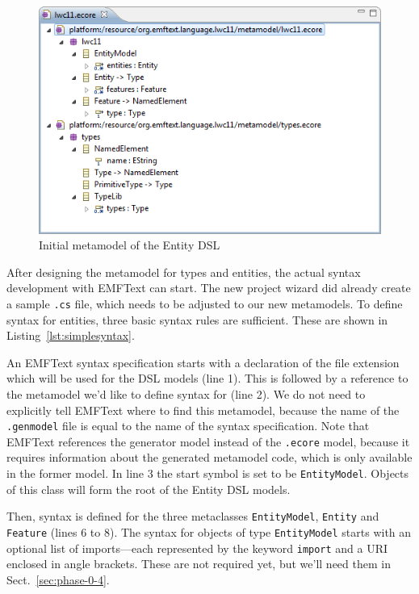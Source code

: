 \documentclass[10pt, pdftex]{llncs}
\begin{document}
\begin{figure}
	\centering
	\includegraphics[width=1.00\textwidth]{figures/metamodel1.png}
	\caption{Initial metamodel of the Entity DSL}
	\label{fig:metamodel1}
\end{figure}

After designing the metamodel for types and entities, the actual syntax
development with EMFText can start. The new project wizard did already create a
sample \texttt{.cs} file, which needs to be adjusted to our new metamodels. To
define syntax for entities, three basic syntax rules are sufficient. These are
shown in Listing~\ref{lst:simplesyntax}.



An EMFText syntax specification starts with a declaration of the file extension
which will be used for the DSL models (line 1). This is followed by a reference
to the metamodel we'd like to define syntax for (line 2). We do not need to
explicitly tell EMFText where to find this metamodel, because the name of the
\texttt{.genmodel} file is equal to the name of the syntax specification. Note
that EMFText references the generator model instead of the \texttt{.ecore}
model, because it requires information about the generated metamodel code, which
is only available in the former model. In line 3 the start symbol is set to be
\texttt{EntityModel}. Objects of this class will form the root of the Entity DSL
models.

Then, syntax is defined for the three metaclasses \texttt{EntityModel},
\texttt{Entity} and \texttt{Feature} (lines 6 to 8). The syntax for objects of
type \texttt{EntityModel} starts with an optional list of imports---each
represented by the keyword \texttt{import} and a URI enclosed in angle brackets.
These are not required yet, but we'll need them in Sect.~\ref{sec:phase-0-4}.
\end{document}
